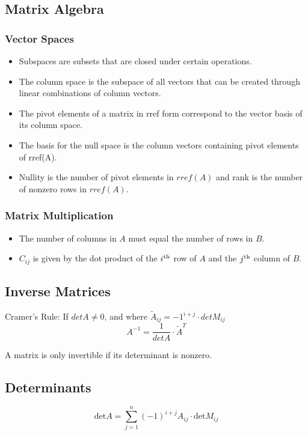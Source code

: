 \documentclass[11pt]{article}
\begin{document}
	\subsection*{Matrix Algebra}
		\subsubsection*{Vector Spaces}
			\begin{itemize}
				\item Subspaces are subsets that are closed under certain operations.
				\item The column space is the subspace of all vectors that can be created through linear combinations of column vectors.
				\item The pivot elements of a matrix in rref form correspond to the vector basis of its column space.
				\item The basis for the null space is the column vectors containing pivot elements of rref(A).
				\item Nullity is the number of pivot elements in $rref(A)$ and rank is the number of nonzero rows in $rref(A)$.
			\end{itemize}
			
		\subsubsection*{Matrix Multiplication}
			\begin{itemize}
				\item The number of columns in $A$ must equal the number of rows in $B$.
				\item $C_{ij}$ is given by the dot product of the $i\textsuperscript{th}$ row of $A$ and the $j\textsuperscript{th}$ column of $B$.
			\end{itemize}
			
	\subsection*{Inverse Matrices}
		Cramer's Rule: If $det A\neq 0$, and where $\tilde{A}_{ij} = -1^{i+j}\cdot detM_{ij}$
		\begin{equation}
			A^{-1} = \frac{1}{det A}\cdot \tilde{A}^T
		\end{equation}
		
		A matrix is only invertible if its determinant is nonzero.
		
	\subsection*{Determinants}
		\begin{equation}
			\text{det} A = \sum_{j=1}^n (-1)^{i+j}A_{ij}\cdot \text{det} M_{ij}
		\end{equation}
		
\end{document}
